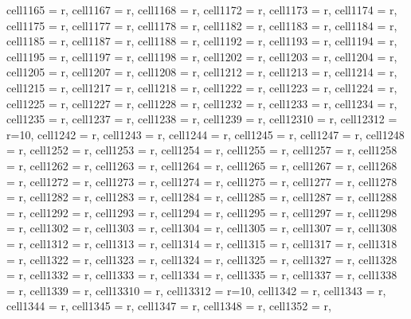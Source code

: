\begin{longtblr}[
  caption = {Linear model estimating all the considered metrics in every alternative scenario.}
]
{  cell{116}{5} = {r},
  cell{116}{7} = {r},
  cell{116}{8} = {r},
  cell{117}{2} = {r},
  cell{117}{3} = {r},
  cell{117}{4} = {r},
  cell{117}{5} = {r},
  cell{117}{7} = {r},
  cell{117}{8} = {r},
  cell{118}{2} = {r},
  cell{118}{3} = {r},
  cell{118}{4} = {r},
  cell{118}{5} = {r},
  cell{118}{7} = {r},
  cell{118}{8} = {r},
  cell{119}{2} = {r},
  cell{119}{3} = {r},
  cell{119}{4} = {r},
  cell{119}{5} = {r},
  cell{119}{7} = {r},
  cell{119}{8} = {r},
  cell{120}{2} = {r},
  cell{120}{3} = {r},
  cell{120}{4} = {r},
  cell{120}{5} = {r},
  cell{120}{7} = {r},
  cell{120}{8} = {r},
  cell{121}{2} = {r},
  cell{121}{3} = {r},
  cell{121}{4} = {r},
  cell{121}{5} = {r},
  cell{121}{7} = {r},
  cell{121}{8} = {r},
  cell{122}{2} = {r},
  cell{122}{3} = {r},
  cell{122}{4} = {r},
  cell{122}{5} = {r},
  cell{122}{7} = {r},
  cell{122}{8} = {r},
  cell{123}{2} = {r},
  cell{123}{3} = {r},
  cell{123}{4} = {r},
  cell{123}{5} = {r},
  cell{123}{7} = {r},
  cell{123}{8} = {r},
  cell{123}{9} = {r},
  cell{123}{10} = {r},
  cell{123}{12} = {r=10}{},
  cell{124}{2} = {r},
  cell{124}{3} = {r},
  cell{124}{4} = {r},
  cell{124}{5} = {r},
  cell{124}{7} = {r},
  cell{124}{8} = {r},
  cell{125}{2} = {r},
  cell{125}{3} = {r},
  cell{125}{4} = {r},
  cell{125}{5} = {r},
  cell{125}{7} = {r},
  cell{125}{8} = {r},
  cell{126}{2} = {r},
  cell{126}{3} = {r},
  cell{126}{4} = {r},
  cell{126}{5} = {r},
  cell{126}{7} = {r},
  cell{126}{8} = {r},
  cell{127}{2} = {r},
  cell{127}{3} = {r},
  cell{127}{4} = {r},
  cell{127}{5} = {r},
  cell{127}{7} = {r},
  cell{127}{8} = {r},
  cell{128}{2} = {r},
  cell{128}{3} = {r},
  cell{128}{4} = {r},
  cell{128}{5} = {r},
  cell{128}{7} = {r},
  cell{128}{8} = {r},
  cell{129}{2} = {r},
  cell{129}{3} = {r},
  cell{129}{4} = {r},
  cell{129}{5} = {r},
  cell{129}{7} = {r},
  cell{129}{8} = {r},
  cell{130}{2} = {r},
  cell{130}{3} = {r},
  cell{130}{4} = {r},
  cell{130}{5} = {r},
  cell{130}{7} = {r},
  cell{130}{8} = {r},
  cell{131}{2} = {r},
  cell{131}{3} = {r},
  cell{131}{4} = {r},
  cell{131}{5} = {r},
  cell{131}{7} = {r},
  cell{131}{8} = {r},
  cell{132}{2} = {r},
  cell{132}{3} = {r},
  cell{132}{4} = {r},
  cell{132}{5} = {r},
  cell{132}{7} = {r},
  cell{132}{8} = {r},
  cell{133}{2} = {r},
  cell{133}{3} = {r},
  cell{133}{4} = {r},
  cell{133}{5} = {r},
  cell{133}{7} = {r},
  cell{133}{8} = {r},
  cell{133}{9} = {r},
  cell{133}{10} = {r},
  cell{133}{12} = {r=10}{},
  cell{134}{2} = {r},
  cell{134}{3} = {r},
  cell{134}{4} = {r},
  cell{134}{5} = {r},
  cell{134}{7} = {r},
  cell{134}{8} = {r},
  cell{135}{2} = {r},
}
\end{longtblr}
